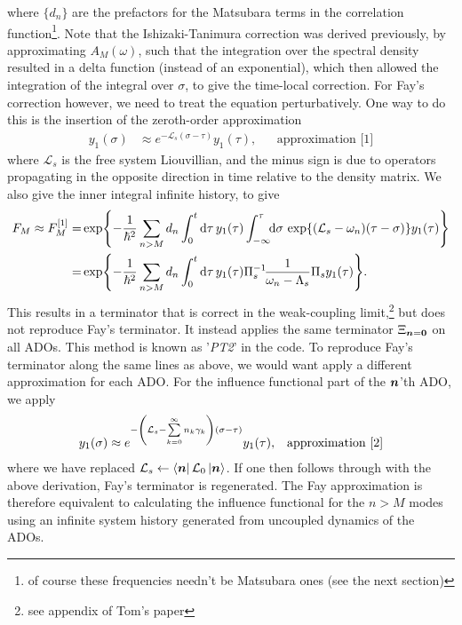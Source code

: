 \documentclass{article}
\begin{document}
where $\{d_n\}$ are the prefactors for the Matsubara terms in the correlation function\footnote{of course these frequencies needn't be Matsubara ones (see the next section)}. Note that the Ishizaki-Tanimura correction was derived previously, by approximating $A_M(\omega)$, such that the integration over the spectral density resulted in a delta function (instead of an exponential), which then allowed the integration of the integral over $\sigma$, to give the time-local correction. For Fay's correction however, we need to treat the equation perturbatively. One way to do this is the insertion of the zeroth-order approximation
\begin{align}
    y_1(\sigma) &\approx e^{-\mathcal{L}_{s}(\sigma-\tau)}y_1(\tau),& &\text{approximation [1]}
\end{align}
where $\mathcal{L}_{s}$ is the free system Liouvillian, and the minus sign is due to operators propagating in the opposite direction in time relative to the density matrix. We also give the inner integral infinite history, to give
\begin{align}
    F_M\approx F_M^{[1]}=&\exp{
     -\frac{1}{\hbar^2}\sum_{n>M}d_n\int_0^t{\rm d}\tau\,y_1(\tau)\int_{-\infty}^\tau\!\!{\rm d}\sigma \,\exp{(\mathcal{L}_s-\omega_n)(\tau-\sigma)}y_1(\tau)}\nonumber
     \\
     =&\exp{
     -\frac{1}{\hbar^2}\sum_{n>M}d_n\int_0^t{\rm d}\tau\,y_1(\tau)\Pi_s^{-1}\!\frac{1}{\omega_n-\Lambda_s}\Pi_s y_1(\tau)}.
\end{align}
This results in a terminator that is correct in the weak-coupling limit,\footnote{see appendix of Tom's paper} but does not reproduce Fay's terminator. It instead applies the same terminator $\Xi_{\boldsymbol{n}=\boldsymbol{0}}$ on all ADOs. This method is known as '\textit{PT2}' in the code. To reproduce Fay's terminator along the same lines as above, we would want apply a different approximation for each ADO. For the influence functional part of the $\boldsymbol{n}$'th ADO, we apply
\begin{align}
    y_1(\sigma) \approx e^{-\left(\mathcal{L}_{s}-\sum\limits_{k=0}^{\infty}n_k\gamma_k \right)(\sigma-\tau)}y_1(\tau),& &\text{approximation [2]}
\end{align}
where we have replaced $\mathcal{L}_s\leftarrow\bra{\boldsymbol{n}}\mathcal{L}_0\ket{\boldsymbol{n}}$. If one then follows through with the above derivation, Fay's terminator is regenerated. The Fay approximation is therefore equivalent to calculating the influence functional for the $n>M$ modes using an infinite system history generated from uncoupled dynamics of the ADOs.
\end{document}
